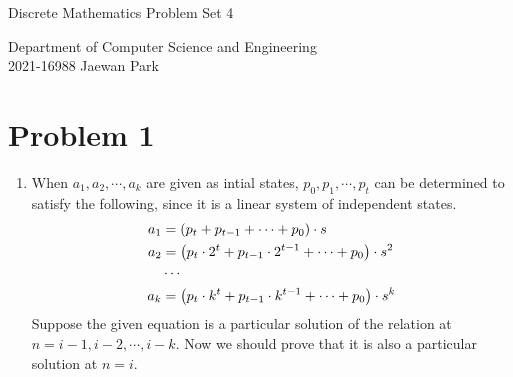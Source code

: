 \documentclass[10pt]{article}
\begin{document}
\vspace{4mm}
\begin{center}
    {\LARGE Discrete Mathematics Problem Set 4} \\
\end{center}
\begin{flushright}
    Department of Computer Science and Engineering \\
    2021-16988 Jaewan Park
\end{flushright}

\section*{Problem 1}
\begin{enumerate}[leftmargin=*]
    \item When $a_1, a_2, \cdots , a_k$ are given as intial states, $p_0, p_1, \cdots , p_t$ can be determined to satisfy the following, since it is a linear system of independent states.
    \begin{align*}
        a_1 &= \qty(p_t + p_{t-1} + \cdots + p_0) \cdot s \\
        a_2 &= \qty(p_t\cdot2^t + p_{t-1}\cdot2^{t-1} + \cdots + p_0) \cdot s^2 \\
        &\cdots \\
        a_k &= \qty(p_t\cdot k^t + p_{t-1}\cdot k^{t-1} + \cdots + p_0) \cdot s^k
    \end{align*}
    Suppose the given equation is a particular solution of the relation at $n=i-1, i-2, \cdots , i-k$.
    Now we should prove that it is also a particular solution at $n=i$.
    

\end{enumerate}
\end{document}
